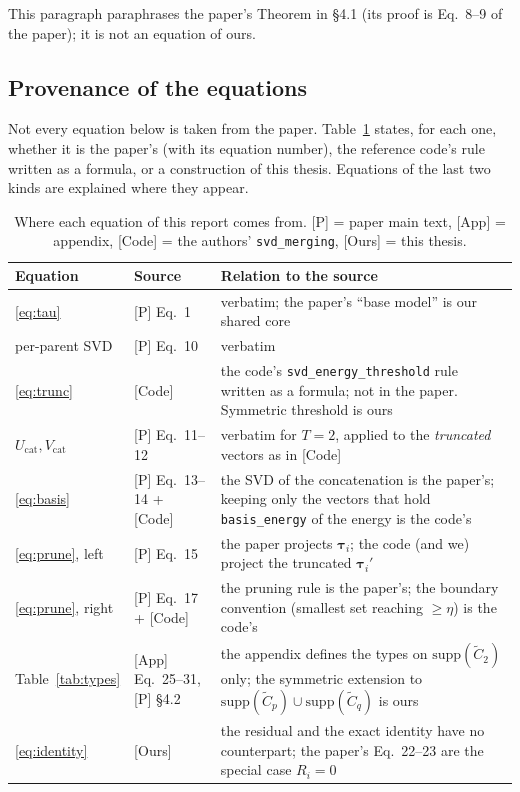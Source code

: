 \documentclass[11pt,a4paper]{article}
\newcommand{\tauv}{\boldsymbol{\tau}}
\newcommand{\Ct}{\tilde{C}}
\newcommand{\code}[1]{\texttt{#1}}
\begin{document}
This paragraph paraphrases the paper's Theorem in \S4.1 (its proof is Eq.~8--9 of the paper); it is not an equation of ours.

\subsection{Provenance of the equations}
\label{sec:provenance}
Not every equation below is taken from the paper. Table~\ref{tab:prov} states, for each one, whether it is the paper's (with its equation number), the reference code's rule written as a formula, or a construction of this thesis. Equations of the last two kinds are explained where they appear.

\begin{table}[h]
\centering\small
\caption{Where each equation of this report comes from. [P] = paper main text, [App] = appendix, [Code] = the authors' \code{svd\_merging}, [Ours] = this thesis.}
\label{tab:prov}
\begin{tabular}{llp{8.6cm}}
\toprule
Equation & Source & Relation to the source \\
\midrule
\ref{eq:tau} & [P] Eq.~1 & verbatim; the paper's ``base model'' is our shared core \\
per-parent SVD & [P] Eq.~10 & verbatim \\
\ref{eq:trunc} & [Code] & the code's \code{svd\_energy\_threshold} rule written as a formula; not in the paper. Symmetric threshold is ours \\
$U_{\mathrm{cat}},V_{\mathrm{cat}}$ & [P] Eq.~11--12 & verbatim for $T=2$, applied to the \emph{truncated} vectors as in [Code] \\
\ref{eq:basis} & [P] Eq.~13--14 + [Code] & the SVD of the concatenation is the paper's; keeping only the vectors that hold \code{basis\_energy} of the energy is the code's \\
\ref{eq:prune}, left & [P] Eq.~15 & the paper projects $\tauv_i$; the code (and we) project the truncated $\tauv_i'$ \\
\ref{eq:prune}, right & [P] Eq.~17 + [Code] & the pruning rule is the paper's; the boundary convention (smallest set reaching $\ge\eta$) is the code's \\
Table~\ref{tab:types} & [App] Eq.~25--31, [P] \S4.2 & the appendix defines the types on $\mathrm{supp}(\Ct_2)$ only; the symmetric extension to $\mathrm{supp}(\Ct_p)\cup\mathrm{supp}(\Ct_q)$ is ours \\
\ref{eq:identity} & [Ours] & the residual and the exact identity have no counterpart; the paper's Eq.~22--23 are the special case $R_i=0$ \\

\end{tabular}
\end{table}
\end{document}

